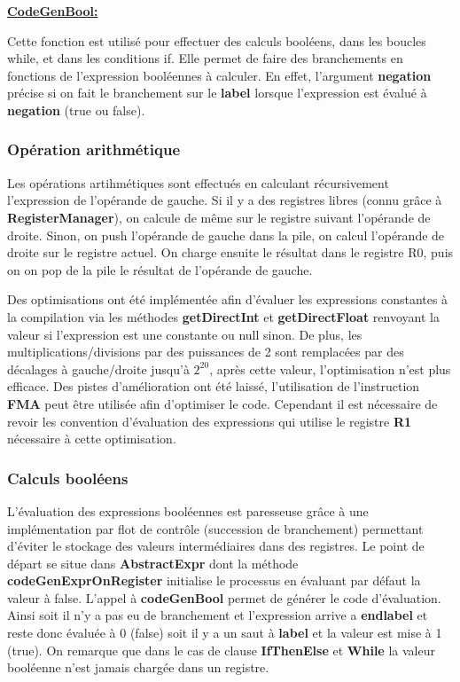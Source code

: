 \documentclass[12pt, a4paper, one side]{article}
\begin{document}
    \medskip
    \textbf{\underline{CodeGenBool:}}

    Cette fonction est utilisé pour effectuer des calculs booléens, dans les
    boucles while, et dans les conditions if. Elle permet de faire des
    branchements en fonctions de l'expression booléennes à calculer. En effet, l'argument \textbf{negation} précise si on fait le branchement sur le \textbf{label} lorsque l'expression est évalué à \textbf{negation} (true ou false).

    \subsubsection{Opération arithmétique}

    Les opérations artihmétiques sont effectués en calculant récursivement
    l'expression de l'opérande de gauche. Si il y a des registres libres
    (connu grâce à \textbf{RegisterManager}), on calcule de même sur le
    registre suivant l'opérande de droite. Sinon, on push l'opérande de gauche
    dans la pile, on calcul l'opérande de droite sur le registre actuel.
    On charge ensuite le résultat dans le registre R0, puis on on pop de la pile le résultat de l'opérande de gauche.

    Des optimisations ont été implémentée afin d'évaluer les expressions constantes à la compilation via les méthodes \textbf{getDirectInt} et \textbf{getDirectFloat} renvoyant la valeur si l'expression est une constante ou null sinon. De plus, les multiplications/divisions par des puissances de 2 sont remplacées par des décalages à gauche/droite jusqu'à $2^{20}$, après cette valeur, l'optimisation n'est plus efficace.
    Des pistes d'amélioration ont été laissé, l'utilisation de l'instruction \textbf{FMA} peut être utilisée afin d'optimiser le code. Cependant il est nécessaire de revoir les convention d'évaluation des expressions qui utilise le registre \textbf{R1} nécessaire à cette optimisation.

    \subsubsection{Calculs booléens}

    L'évaluation des expressions booléennes est paresseuse grâce à une implémentation par flot de contrôle (succession de branchement) permettant d'éviter le stockage des valeurs intermédiaires dans des registres. Le point de départ se situe dans \textbf{AbstractExpr} dont la méthode \textbf{codeGenExprOnRegister} initialise le processus en évaluant par défaut la valeur à false. L'appel à \textbf{codeGenBool}
    permet de générer le code d'évaluation. Ainsi soit il n'y a pas eu de branchement et l'expression arrive a \textbf{endlabel} et reste donc évaluée à 0 (false) soit il y a un saut à \textbf{label} et la valeur est mise à 1 (true). On remarque que dans le cas de clause \textbf{IfThenElse} et \textbf{While} la valeur booléenne n'est jamais chargée dans un registre.
\end{document}
